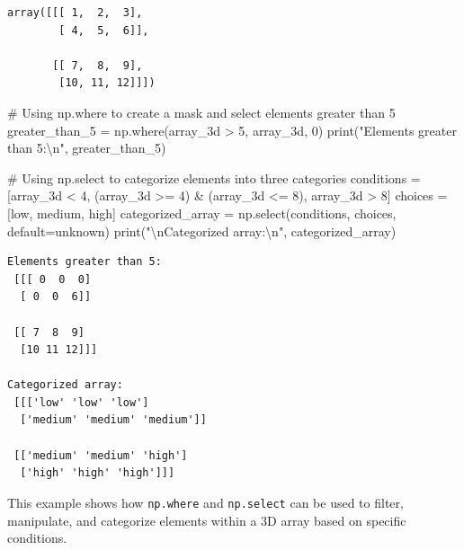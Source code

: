 \documentclass[
  letterpaper,
  DIV=11,
  numbers=noendperiod]{scrreprt}
\newenvironment{Shaded}{\begin{snugshade}}{\end{snugshade}}
\newcommand{\BuiltInTok}[1]{\textcolor[rgb]{0.00,0.23,0.31}{#1}}
\newcommand{\CharTok}[1]{\textcolor[rgb]{0.13,0.47,0.30}{#1}}
\newcommand{\CommentTok}[1]{\textcolor[rgb]{0.37,0.37,0.37}{#1}}
\newcommand{\DecValTok}[1]{\textcolor[rgb]{0.68,0.00,0.00}{#1}}
\newcommand{\NormalTok}[1]{\textcolor[rgb]{0.00,0.23,0.31}{#1}}
\newcommand{\OperatorTok}[1]{\textcolor[rgb]{0.37,0.37,0.37}{#1}}
\newcommand{\StringTok}[1]{\textcolor[rgb]{0.13,0.47,0.30}{#1}}
\begin{document}
\begin{verbatim}
array([[[ 1,  2,  3],
        [ 4,  5,  6]],

       [[ 7,  8,  9],
        [10, 11, 12]]])
\end{verbatim}

\begin{Shaded}
\begin{Highlighting}[]
\CommentTok{\# Using np.where to create a mask and select elements greater than 5}
\NormalTok{greater\_than\_5 }\OperatorTok{=}\NormalTok{ np.where(array\_3d }\OperatorTok{\textgreater{}} \DecValTok{5}\NormalTok{, array\_3d, }\DecValTok{0}\NormalTok{)}
\BuiltInTok{print}\NormalTok{(}\StringTok{"Elements greater than 5:}\CharTok{\textbackslash{}n}\StringTok{"}\NormalTok{, greater\_than\_5)}

\CommentTok{\# Using np.select to categorize elements into three categories}
\NormalTok{conditions }\OperatorTok{=}\NormalTok{ [array\_3d }\OperatorTok{\textless{}} \DecValTok{4}\NormalTok{, (array\_3d }\OperatorTok{\textgreater{}=} \DecValTok{4}\NormalTok{) }\OperatorTok{\&}\NormalTok{ (array\_3d }\OperatorTok{\textless{}=} \DecValTok{8}\NormalTok{), array\_3d }\OperatorTok{\textgreater{}} \DecValTok{8}\NormalTok{]}
\NormalTok{choices }\OperatorTok{=}\NormalTok{ [}\StringTok{\textquotesingle{}low\textquotesingle{}}\NormalTok{, }\StringTok{\textquotesingle{}medium\textquotesingle{}}\NormalTok{, }\StringTok{\textquotesingle{}high\textquotesingle{}}\NormalTok{]}
\NormalTok{categorized\_array }\OperatorTok{=}\NormalTok{ np.select(conditions, choices, default}\OperatorTok{=}\StringTok{\textquotesingle{}unknown\textquotesingle{}}\NormalTok{)}
\BuiltInTok{print}\NormalTok{(}\StringTok{"}\CharTok{\textbackslash{}n}\StringTok{Categorized array:}\CharTok{\textbackslash{}n}\StringTok{"}\NormalTok{, categorized\_array)}
\end{Highlighting}
\end{Shaded}

\begin{verbatim}
Elements greater than 5:
 [[[ 0  0  0]
  [ 0  0  6]]

 [[ 7  8  9]
  [10 11 12]]]

Categorized array:
 [[['low' 'low' 'low']
  ['medium' 'medium' 'medium']]

 [['medium' 'medium' 'high']
  ['high' 'high' 'high']]]
\end{verbatim}

This example shows how \texttt{np.where} and \texttt{np.select} can be
used to filter, manipulate, and categorize elements within a 3D array
based on specific conditions.
\end{document}

